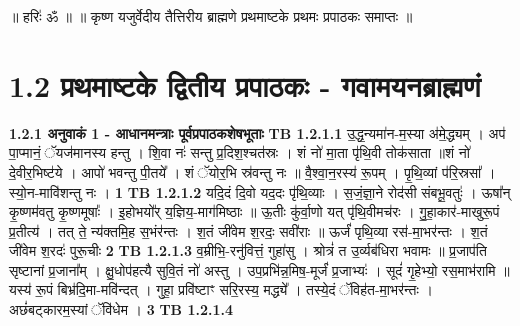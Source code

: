 \documentclass[17pt]{extarticle}
\begin{document}
       

        ॥ हरिः॑ ॐ ॥
॥ कृष्ण यजुर्वेदीय तैत्तिरीय ब्राह्मणे प्रथमाष्टके प्रथमः प्रपाठकः समाप्तः ॥ \newline
        \pagebreak
        
        
        
     \section*{ 1.2     प्रथमाष्टके द्वितीय प्रपाठकः - गवामयनब्राह्मणं }
                \textbf{ 1.2.1     अनुवाकं   1 - आधानमन्त्राः पूर्वप्रपाठकशेषभूताः} \newline
                                \textbf{ TB 1.2.1.1} \newline
                  उ॒द्ध॒न्यमा॑न-म॒स्या अ॑मे॒द्ध्यम् । अप॑ पा॒प्मानं॒ ॅयज॑मानस्य हन्तु । शि॒वा नः॑ सन्तु प्र॒दिश॒श्चत॑स्रः । शं नो॑ मा॒ता पृ॑थि॒वी तोक॑साता ॥शं नो॑ दे॒वीर॒भिष्ट॑ये । आपो॑ भवन्तु पी॒तये᳚ । शं ॅयोर॒भि स्र॑वन्तु नः ॥ वै॒श्वा॒न॒रस्य॑ रू॒पम् । पृ॒थि॒व्यां प॑रि॒स्रसा᳚ । स्यो॒न-मावि॑शन्तु नः । \textbf{ 1} \newline
                  \newline
                                \textbf{ TB 1.2.1.2} \newline
                  यदि॒दं दि॒वो यद॒दः पृ॑थि॒व्याः । स॒जं॒ज्ञा॒ने रोद॑सी संबभू॒वतुः॑ । ऊषा᳚न् कृ॒ष्णम॑वतु कृ॒ष्णमूषाः᳚ । इ॒होभयो᳚र् य॒ज्ञिय॒-माग॑मिष्ठाः ॥ ऊ॒तीः कु॑र्वा॒णो यत् पृ॑थि॒वीमच॑रः । गु॒हा॒कार॑-माखुरू॒पं प्र॒तीत्य॑ । तत् ते॒ न्य॑क्तमि॒ह स॒भंर॑न्तः । श॒तं जी॑वेम श॒रदः॒ सवी॑राः ॥ ऊर्जं॑ पृथि॒व्या रस॑-मा॒भर॑न्तः । श॒तं जी॑वेम श॒रदः॑ पुरू॒चीः \textbf{ 2} \newline
                  \newline
                                \textbf{ TB 1.2.1.3} \newline
                  व॒म्रीभि॒-रनु॑वित्तं॒ गुहा॑सु । श्रोत्रं॑ त उ॒र्व्यब॑धिरा भवामः ॥ प्र॒जाप॑ति सृष्टानां प्र॒जाना᳚म् । क्षु॒धोप॑हत्यै सुवि॒तं नो॑ अस्तु । उप॒प्रभि॑न्न॒मिष॒-मूर्जं॑ प्र॒जाभ्यः॑ । सूदं॑ गृ॒हेभ्यो॒ रस॒माभ॑रामि ॥यस्य॑ रू॒पं बिभ्र॑दि॒मा-मवि॑न्दत् । गुहा॒ प्रवि॑ष्टाꣳ सरि॒रस्य॒ मद्ध्ये᳚ । तस्ये॒दं ॅविह॑त-मा॒भर॑न्तः । अछं॑बट्कारम॒स्यां ॅवि॑धेम । \textbf{ 3} \newline
                  \newline
                                \textbf{ TB 1.2.1.4} \newline
\end{document}
